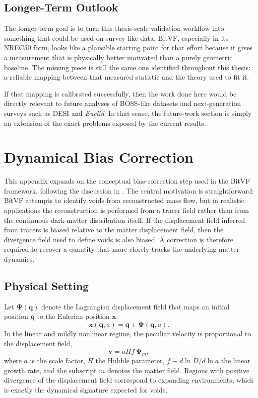 \documentclass[12pt]{report}
\begin{document}
\section{Longer-Term Outlook}

The longer-term goal is to turn this thesis-scale validation workflow into something that could be used on survey-like data. BitVF, especially in its NREC50 form, looks like a plausible starting point for that effort because it gives a measurement that is physically better motivated than a purely geometric baseline. The missing piece is still the same one identified throughout this thesis: a reliable mapping between that measured statistic and the theory used to fit it.

If that mapping is calibrated successfully, then the work done here would be directly relevant to future analyses of BOSS-like datasets and next-generation surveys such as DESI and \textit{Euclid}. In that sense, the future-work section is simply an extension of the exact problems exposed by the current results.

\clearpage
\appendix

\chapter{Dynamical Bias Correction}
\label{app:bias_correction}

This appendix expands on the conceptual bias-correction step used in the BitVF framework, following the discussion in \citet{Sartori2025}. The central motivation is straightforward: BitVF attempts to identify voids from reconstructed mass flow, but in realistic applications the reconstruction is performed from a tracer field rather than from the continuous dark-matter distribution itself. If the displacement field inferred from tracers is biased relative to the matter displacement field, then the divergence field used to define voids is also biased. A correction is therefore required to recover a quantity that more closely tracks the underlying matter dynamics.

\section{Physical Setting}

Let $\boldsymbol{\Psi}(\mathbf{q})$ denote the Lagrangian displacement field that maps an initial position $\mathbf{q}$ to the Eulerian position $\mathbf{x}$:
\begin{equation}
    \mathbf{x}(\mathbf{q},a) = \mathbf{q} + \boldsymbol{\Psi}(\mathbf{q},a).
\end{equation}
In the linear and mildly nonlinear regime, the peculiar velocity is proportional to the displacement field,
\begin{equation}
    \mathbf{v} = aHf\,\boldsymbol{\Psi}_m,
\end{equation}
where $a$ is the scale factor, $H$ the Hubble parameter, $f \equiv d\ln D/d\ln a$ the linear growth rate, and the subscript $m$ denotes the matter field. Regions with positive divergence of the displacement field correspond to expanding environments, which is exactly the dynamical signature expected for voids.
\end{document}
